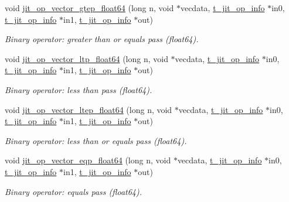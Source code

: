 \begin{DoxyCompactItemize}
void \hyperlink{group__opvecmod_gafd58aaa7408cc5522523e4779f3795b4}{jit\_\-op\_\-vector\_\-gtep\_\-float64} (long n, void $\ast$vecdata, \hyperlink{structt__jit__op__info}{t\_\-jit\_\-op\_\-info} $\ast$in0, \hyperlink{structt__jit__op__info}{t\_\-jit\_\-op\_\-info} $\ast$in1, \hyperlink{structt__jit__op__info}{t\_\-jit\_\-op\_\-info} $\ast$out)
\begin{DoxyCompactList}\small\item\em Binary operator: greater than or equals pass (float64). \item\end{DoxyCompactList}\item 
void \hyperlink{group__opvecmod_gaea3f3f7bdd97812e3023939a957ddbbf}{jit\_\-op\_\-vector\_\-ltp\_\-float64} (long n, void $\ast$vecdata, \hyperlink{structt__jit__op__info}{t\_\-jit\_\-op\_\-info} $\ast$in0, \hyperlink{structt__jit__op__info}{t\_\-jit\_\-op\_\-info} $\ast$in1, \hyperlink{structt__jit__op__info}{t\_\-jit\_\-op\_\-info} $\ast$out)
\begin{DoxyCompactList}\small\item\em Binary operator: less than pass (float64). \item\end{DoxyCompactList}\item 
void \hyperlink{group__opvecmod_gaac77d494c9dbb01feb79bda7316886d5}{jit\_\-op\_\-vector\_\-ltep\_\-float64} (long n, void $\ast$vecdata, \hyperlink{structt__jit__op__info}{t\_\-jit\_\-op\_\-info} $\ast$in0, \hyperlink{structt__jit__op__info}{t\_\-jit\_\-op\_\-info} $\ast$in1, \hyperlink{structt__jit__op__info}{t\_\-jit\_\-op\_\-info} $\ast$out)
\begin{DoxyCompactList}\small\item\em Binary operator: less than or equals pass (float64). \item\end{DoxyCompactList}\item 
void \hyperlink{group__opvecmod_ga8a042249e30eef59453dab03202874b8}{jit\_\-op\_\-vector\_\-eqp\_\-float64} (long n, void $\ast$vecdata, \hyperlink{structt__jit__op__info}{t\_\-jit\_\-op\_\-info} $\ast$in0, \hyperlink{structt__jit__op__info}{t\_\-jit\_\-op\_\-info} $\ast$in1, \hyperlink{structt__jit__op__info}{t\_\-jit\_\-op\_\-info} $\ast$out)
\begin{DoxyCompactList}\small\item\em Binary operator: equals pass (float64). \item\end{DoxyCompactList}\item 

\end{DoxyCompactItemize}
